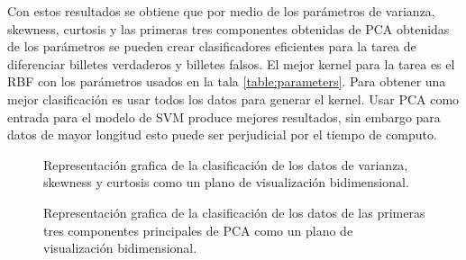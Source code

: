 Con estos resultados se obtiene que por medio de los parámetros de varianza, skewness, curtosis y las primeras tres componentes obtenidas de PCA obtenidas de los parámetros se pueden crear clasificadores eficientes para la tarea de diferenciar billetes verdaderos y billetes falsos. El mejor kernel para la tarea es el RBF con los parámetros usados en la tala \ref{table:parameters}. Para obtener una mejor clasificación es usar todos los datos para generar el kernel. Usar PCA como entrada para el modelo de SVM produce mejores resultados, sin embargo para datos de mayor longitud esto puede ser perjudicial por el tiempo de computo.

\pagebreak

\begin{figure}[H]
    \centering
    \caption{Representación grafica de la clasificación de los datos de varianza, skewness y curtosis como un plano de visualización bidimensional.}
    \label{fig:svm_data}
\end{figure}

\pagebreak

\begin{figure}[H]
    \centering
    \caption{Representación grafica de la clasificación de los datos de las primeras tres componentes principales de PCA como un plano de visualización bidimensional.}
    \label{fig:svm_pca}
\end{figure}
